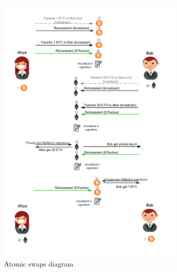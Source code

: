    \begin{figure}[htb!]
    \includegraphics[width=0.8\textwidth]{./figures/atomic_swaps.png}
    \centering
    \caption{Atomic swaps diagram}%
    \centering
    \label{fig:atomic}
    \end{figure}
